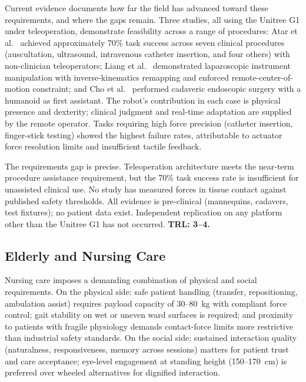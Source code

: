 \documentclass[acmsmall]{acmart}
\begin{document}
Current evidence documents how far the field has advanced toward these
requirements, and where the gaps remain. Three studies, all using the Unitree
G1 under teleoperation, demonstrate feasibility across a range of procedures:
Atar et al.~\cite{atar2025humanoids} achieved approximately 70\% task success
across seven clinical procedures (auscultation, ultrasound, intravenous
catheter insertion, and four others) with non-clinician teleoperators; Liang et
al.~\cite{liang2025lapsurgie} demonstrated laparoscopic instrument manipulation
with inverse-kinematics remapping and enforced remote-center-of-motion
constraint; and Cho et al.~\cite{cho2026humanoid} performed cadaveric
endoscopic surgery with a humanoid as first assistant. The robot's contribution
in each case is physical presence and dexterity; clinical judgment and
real-time adaptation are supplied by the remote operator. Tasks requiring high
force precision (catheter insertion, finger-stick testing) showed the highest
failure rates, attributable to actuator force resolution limits and insufficient
tactile feedback.

The requirements gap is precise. Teleoperation architecture meets the
near-term procedure assistance requirement, but the 70\% task success rate is
insufficient for unassisted clinical use. No study has measured forces in
tissue contact against published safety thresholds. All evidence is pre-clinical
(mannequins, cadavers, test fixtures); no patient data exist. Independent
replication on any platform other than the Unitree G1 has not occurred.
\textbf{TRL: 3--4.}

\subsection{Elderly and Nursing Care}
\label{sec:eldercare}

Nursing care imposes a demanding combination of physical and social requirements.
On the physical side: safe patient handling (transfer, repositioning, ambulation
assist) requires payload capacity of 30--80~kg with compliant force control;
gait stability on wet or uneven ward surfaces is required; and proximity to
patients with fragile physiology demands contact-force limits more restrictive
than industrial safety standards. On the social side: sustained interaction
quality (naturalness, responsiveness, memory across sessions) matters for
patient trust and care acceptance; eye-level engagement at standing height
(150--170~cm) is preferred over wheeled alternatives for dignified interaction.
\end{document}

